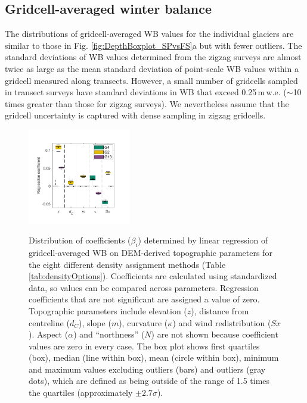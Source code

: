 \documentclass[review,oneside, letterpaper]{igs}
\begin{document}
\subsection{Gridcell-averaged winter balance}

The distributions of gridcell-averaged WB values for the individual glaciers are similar to those in Fig. \ref{fig:DepthBoxplot_SPvsFS}a but with fewer outliers. The standard deviations of WB values determined from the zigzag surveys are almost twice as large as the mean standard deviation of point-scale WB values within a gridcell measured along transects. However, a small number of gridcells sampled in transect surveys have standard deviations in WB that exceed 0.25\,m\,w.e. ($\sim$10 times greater than those for zigzag surveys). We nevertheless assume that the gridcell uncertainty is captured with dense sampling in zigzag gridcells. 

\begin{figure}
	\centering
	\includegraphics[width =0.4\textwidth]{BetaCoeffs.pdf}\\
	\caption{Distribution of coefficients ($\beta_i$) determined by linear regression of gridcell-averaged WB on DEM-derived topographic parameters for the eight different density assignment methods (Table \ref{tab:densityOptions}). Coefficients are calculated using standardized data, so values can be compared across parameters. Regression coefficients that are not significant are assigned a value of zero. Topographic parameters include elevation ($z$), distance from centreline ($d_C$), slope ($m$), curvature ($\kappa$) and wind redistribution ($Sx$).  Aspect ($\alpha$) and ``northness'' ($N$) are not shown because coefficient values are zero in every case. The box plot shows first quartiles (box), median (line within box), mean (circle within box), minimum and maximum values excluding outliers (bars) and outliers (gray dots), which are defined as being outside of the range of 1.5 times the quartiles (approximately $\pm2.7\sigma$). }
	\label{fig:BetaCoeffs}
\end{figure}
\end{document}
